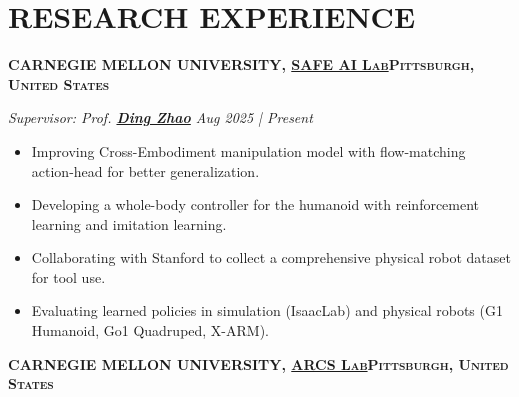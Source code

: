 \documentclass[a4paper,9pt]{extarticle}
\begin{document}
\section*{{\textbf{\fontsize{14pt}{8pt}\selectfont R}\textbf{\scshape ESEARCH EXPERIENCE}}}
{\textbf{\fontsize{12pt}{4pt}\selectfont C}\textbf{\scshape ARNEGIE MELLON UNIVERSITY, {\href{https://safeai-lab.github.io/}{SAFE AI Lab}}\hfill Pittsburgh, United States}}
\par\textit{Supervisor: Prof. {\href{https://www.meche.engineering.cmu.edu/directory/bios/zhao-ding.html}{\textbf{Ding Zhao}}}   \hfill Aug 2025 | Present}  %
\begin{itemize}
    \item Improving Cross-Embodiment manipulation model with flow-matching action-head for better generalization.
    \item Developing a whole-body controller for the humanoid with reinforcement learning and imitation learning.
    \item Collaborating with Stanford to collect a comprehensive physical robot dataset for tool use.
    \item Evaluating learned policies in simulation (IsaacLab) and physical robots (G1 Humanoid, Go1 Quadruped, X-ARM).  
\end{itemize}
{\textbf{\fontsize{12pt}{4pt}\selectfont C}\textbf{\scshape ARNEGIE MELLON UNIVERSITY, {\href{https://www.ri.cmu.edu/robotics-groups/arcs-lab/}{ARCS Lab}}\hfill Pittsburgh, United States}}
\end{document}
